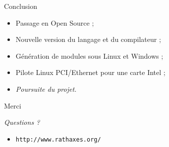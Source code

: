 \documentclass[xcolor={usenames,svgnames}]{beamer}
\begin{document}
\begin{frame}{Conclusion}
\large{
\begin{itemize}
\item Passage en Open Source ;
\item Nouvelle version du langage et du compilateur ;
\item Génération de modules sous Linux et Windows ;
\item Pilote Linux PCI/Ethernet pour une carte Intel ;
\item \LARGE{\emph{Poursuite du projet.}}
\end{itemize}
}
\end{frame}

\begin{frame}{Merci}
\begin{center}
\Huge{\emph{Questions ?}}
\end{center}

\vspace{2em}
\begin{itemize}
\item \Large{\texttt{http://www.rathaxes.org/}}
\end{itemize}
\end{frame}


\begin{frame}[fragile]
\begin{center}
\end{center}
\end{frame}
\end{document}
